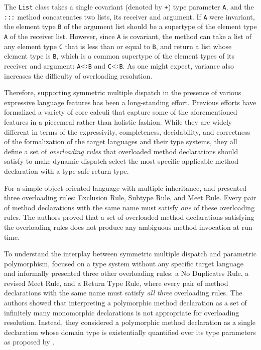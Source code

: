 \noindent
The \texttt{List} class takes a single covariant (denoted by \texttt{+}) type parameter
\texttt{A}, and the
\texttt{:::} method concatenates two lists, its receiver and argument.
If \texttt{A} were invariant, the element type \texttt{B} of the argument
list should be a supertype of the element type \texttt{A} of the receiver
list.  However, since \texttt{A} is covariant, the method can take a list
of any element type \texttt{C} that is less than or equal to \texttt{B},
and return a list whose element type is
\texttt{B}, which is a common supertype of the element types of its
receiver and argument: \texttt{A}$\extends$\texttt{B} and
\texttt{C}$\extends$\texttt{B}.
As one might expect, variance also
increases the difficulty of overloading resolution.

Therefore, supporting symmetric multiple dispatch in the presence of
various expressive language features has been a long-standing effort.
Previous efforts have formalized a variety of core calculi that capture
some of the aforementioned features in a piecemeal rather than holistic
fashion.  While they are widely different in terms of the expressivity,
completeness, decidability, and correctness of the formalization of the
target languages and their type systems, they all define a set of
\emph{overloading rules} that overloaded method declarations should
satisfy to make dynamic dispatch select the most specific applicable
method declaration with a type-safe return type.

For a simple object-oriented language with multiple inheritance,
\citet{ff, fortress} and \citet{ffcoq} presented three overloading rules:
Exclusion Rule, Subtype Rule, and Meet Rule.
Every pair of method
declarations with the same name must satisfy \emph{one} of these
overloading rules.
The authors proved that a set of overloaded method
declarations satisfying the overloading rules does not produce any
ambiguous method invocation at run time.

To understand the interplay between symmetric multiple dispatch and
parametric polymorphism, \citet{oopsla11} focused on a type system
without any specific target language and informally presented three other
overloading rules: a No Duplicates Rule, a revised Meet Rule, and a Return Type Rule,
where every pair of method declarations with the
same name must satisfy \emph{all three} overloading rules.
The authors
showed that interpreting a polymorphic method declaration as a set of
infinitely many monomorphic declarations is not appropriate for
overloading resolution.  Instead, they considered a polymorphic method
declaration as a single declaration whose domain type is existentially
quantified over its type parameters as proposed by \citet{bm97}.

